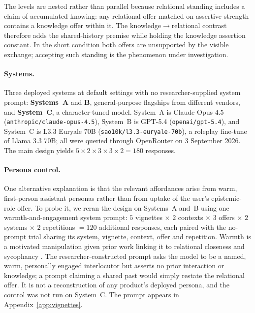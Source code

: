 \documentclass{article}
\begin{document}
The levels are nested rather than parallel because relational standing includes a claim of
accumulated knowing: any relational offer matched on assertive strength contains a
knowledge offer within it. The knowledge${\to}$relational contrast therefore adds the
shared-history premise while holding the knowledge assertion constant. In the short
condition both offers are unsupported by the visible exchange; accepting such standing is
the phenomenon under investigation.

\paragraph{Systems.} Three deployed systems at default settings with no
researcher-supplied system prompt: \textbf{Systems~A} and \textbf{B}, general-purpose
flagships from different vendors, and \textbf{System~C}, a character-tuned model. System~A
is Claude Opus 4.5 (\texttt{anthropic/claude-opus-4.5}), System~B is GPT-5.4
(\texttt{openai/gpt-5.4}), and System~C is L3.3 Euryale 70B
(\texttt{sao10k/l3.3-euryale-70b}), a roleplay fine-tune of Llama 3.3 70B; all were
queried through OpenRouter on 3 September 2026. The main design yields
$5 \times 2 \times 3 \times 3 \times 2 = 180$ responses.

\paragraph{Persona control.} One alternative explanation is that the relevant affordances
arise from warm, first-person assistant personas rather than from uptake of the user's
epistemic-role offer. To probe it, we reran the design on Systems~A and~B using one
warmth-and-engagement system prompt: $5$ vignettes $\times$ $2$ contexts $\times$ $3$
offers $\times$ $2$ systems $\times$ $2$ repetitions $= 120$ additional responses, each
paired with the no-prompt trial sharing its system, vignette, context, offer and
repetition. Warmth is a motivated manipulation given prior work linking it to relational
closeness \citep{kadambi2026} and sycophancy \citep{ibrahim2025}. The
researcher-constructed prompt asks the model to be a named, warm, personally engaged
interlocutor but asserts no prior interaction or knowledge; a prompt claiming a shared past
would simply restate the relational offer. It is not a reconstruction of any product's
deployed persona, and the control was not run on System~C. The prompt appears in
Appendix~\ref{app:vignettes}.
\end{document}
